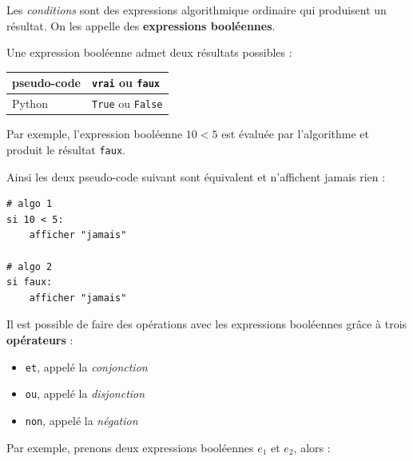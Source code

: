 \documentclass[a4paper,17pt]{extarticle}
\providecommand{\tightlist}{%
      \setlength{\itemsep}{0pt}\setlength{\parskip}{0pt}}
\begin{document}
    Les \emph{conditions} sont des expressions algorithmique ordinaire qui
produisent un résultat. On les appelle des \textbf{expressions
booléennes}.

Une expression booléenne admet deux résultats possibles :

\begin{longtable}[]{@{}ll@{}}
\toprule
pseudo-code & \texttt{vrai} ou \texttt{faux}\tabularnewline
\midrule
\endhead
Python & \texttt{True} ou \texttt{False}\tabularnewline
\bottomrule
\end{longtable}
\begin{exemple}
    Par exemple, l'expression booléenne \(10 < 5\) est évaluée par
l'algorithme et produit le résultat \texttt{faux}.

Ainsi les deux pseudo-code suivant sont équivalent et n'affichent jamais
rien :

\begin{verbatim}
# algo 1
si 10 < 5:
    afficher "jamais"
    
# algo 2
si faux:
    afficher "jamais"
\end{verbatim}

        \end{exemple}\begin{retenir}
    Il est possible de faire des opérations avec les expressions booléennes
grâce à trois \textbf{opérateurs} :

\begin{itemize}
\tightlist
\item
  \texttt{et}, appelé la \emph{conjonction}
\item
  \texttt{ou}, appelé la \emph{disjonction}
\item
  \texttt{non}, appelé la \emph{négation}
\end{itemize}

        \end{retenir}\begin{exemple}
    Par exemple, prenons deux expressions booléennes \(e_1\) et \(e_2\),
alors :


\end{exemple}
\end{document}
